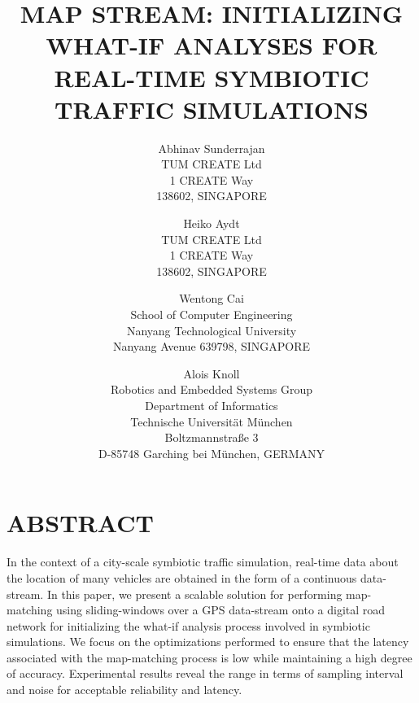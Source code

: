 \documentclass{wscpaperproc}
\theoremstyle{wsc}
\begin{document}
%
%

\title{MAP STREAM: INITIALIZING WHAT-IF ANALYSES FOR REAL-TIME SYMBIOTIC TRAFFIC SIMULATIONS}

\author{Abhinav Sunderrajan\\ [12pt]
TUM CREATE Ltd\\
1 CREATE Way\\
138602, SINGAPORE\\
\and
Heiko Aydt \\[12pt]
TUM CREATE Ltd\\
1 CREATE Way \\
138602, SINGAPORE \\
\and
Wentong Cai\\ [12pt]
School of Computer Engineering\\
Nanyang Technological University\\
Nanyang Avenue 639798, SINGAPORE\\
\and
Alois Knoll\\ [12pt]
Robotics and Embedded Systems Group \\
Department of Informatics\\
Technische Universit\"at M\"unchen\\
Boltzmannstra{\ss}e 3\\
D-85748 Garching bei M\"unchen, GERMANY
}






\maketitle

\section*{ABSTRACT}
In the context of a city-scale symbiotic  traffic simulation, real-time data about the location of many vehicles are obtained in the form of a continuous data-stream. In this paper, we present a scalable solution for performing map-matching using sliding-windows over a GPS data-stream onto a digital road network for initializing the what-if analysis process involved in symbiotic simulations. We focus on the optimizations performed to ensure that the latency associated with the map-matching process is low while maintaining a high degree of accuracy. Experimental results reveal the range in terms of sampling interval and noise for acceptable reliability and latency.
\end{document}
